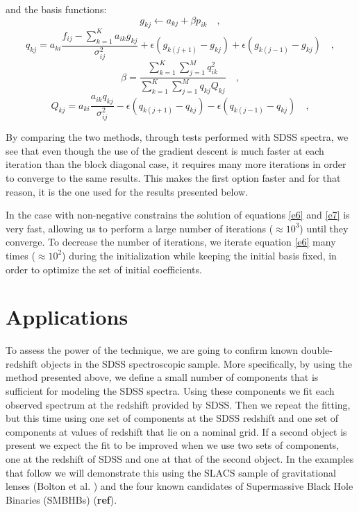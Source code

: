 \documentclass[apj]{emulateapj}
\begin{document}
and the basis functions:
\begin{equation}\label{e14}
g_{kj} \gets a_{kj}+\beta p_{ik}
\quad ,
\end{equation}
\begin{equation}\label{e15}
q_{kj}=a_{ki}\frac{f_{ij}-\sum_{k=1}^{K}a_{ik}g_{kj}}{\sigma^2_{ij}}+\epsilon(g_{k(j+1)}-g_{kj})+\epsilon(g_{k(j-1)}-g_{kj})
\quad ,
\end{equation}
\begin{equation}\label{e16}
\beta=\frac{\sum_{k=1}^{K}\sum_{j=1}^{M}q^2_{ik}}{\sum_{k=1}^{K}\sum_{j=1}^{M}q_{kj}Q_{kj}}
\quad ,
\end{equation}
\begin{equation}\label{e17}
Q_{kj}=a_{ki}\frac{a_{ik}q_{kj}}{\sigma^2_{ij}}-\epsilon(q_{k(j+1)}-q_{kj})-\epsilon(q_{k(j-1)}-q_{kj})
\quad ,
\end{equation}

By comparing the two methods, through tests performed with SDSS spectra, we see that even though the use of the gradient descent is much faster at each iteration than the block diagonal case, it requires many more iterations in order to converge to the same results. This makes the first option faster and for that reason, it is the one used for the results presented below.

In the case with non-negative constrains the solution of equations \ref{e6} and \ref{e7} is very fast, allowing us to perform a large number of iterations ($\approx 10^3$) until they converge. To decrease the number of iterations, we iterate equation \ref{e6} many times ($\approx 10^2$) during the initialization while keeping the initial basis fixed, in order to optimize the set of initial coefficients.

\section{Applications}\label{applications}
To assess the power of the technique, we are going to confirm known double-redshift objects in the SDSS spectroscopic sample. More specifically, by using the method presented above, we define a small number of components that is sufficient for modeling the SDSS spectra. Using these components we fit each observed spectrum at the redshift provided by SDSS. Then we repeat the fitting, but this time using one set of components at the SDSS redshift and one set of components at values of redshift that lie on a nominal grid. If a second object is present we expect the fit to be improved when we use two sets of components, one at the redshift of SDSS and one at that of the second object. In the examples that follow we will demonstrate this using the SLACS sample of gravitational lenses (Bolton et al. \citealt{bolton}) and the four known candidates of Supermassive Black Hole Binaries (SMBHBs) (\textbf{ref}).
\end{document}

